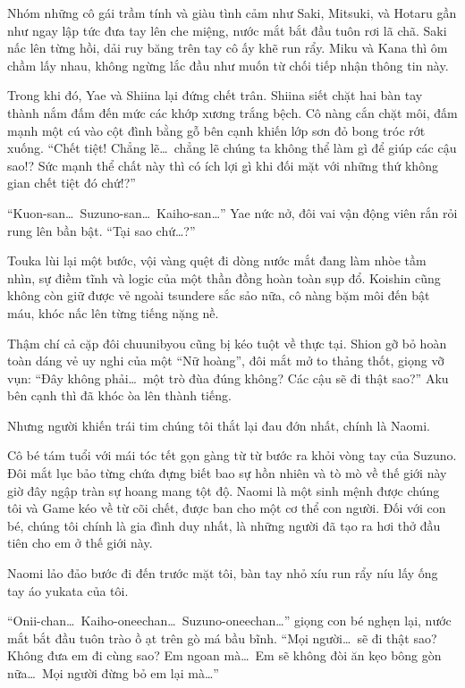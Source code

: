 \documentclass[../main.tex]{subfiles}
\begin{document}
Nhóm những cô gái trầm tính và giàu tình cảm như Saki, Mitsuki, và Hotaru gần như ngay lập tức đưa tay lên che miệng, nước mắt bắt đầu tuôn rơi lã chã. Saki nấc lên từng hồi, dải ruy băng trên tay cô ấy khẽ run rẩy. Miku và Kana thì ôm chầm lấy nhau, không ngừng lắc đầu như muốn từ chối tiếp nhận thông tin này.

Trong khi đó, Yae và Shiina lại đứng chết trân. Shiina siết chặt hai bàn tay thành nắm đấm đến mức các khớp xương trắng bệch. Cô nàng cắn chặt môi, đấm mạnh một cú vào cột đình bằng gỗ bên cạnh khiến lớp sơn đỏ bong tróc rớt xuống. ``Chết tiệt! Chẳng lẽ\dots\ chẳng lẽ chúng ta không thể làm gì để giúp các cậu sao!? Sức mạnh thể chất này thì có ích lợi gì khi đối mặt với những thứ không gian chết tiệt đó chứ!?''

``Kuon-san\dots\ Suzuno-san\dots\ Kaiho-san\dots'' Yae nức nở, đôi vai vận động viên rắn rỏi rung lên bần bật. ``Tại sao chứ\dots?''

Touka lùi lại một bước, vội vàng quệt đi dòng nước mắt đang làm nhòe tầm nhìn, sự điềm tĩnh và logic của một thần đồng hoàn toàn sụp đổ. Koishin cũng không còn giữ được vẻ ngoài tsundere sắc sảo nữa, cô nàng bặm môi đến bật máu, khóc nấc lên từng tiếng nặng nề.

Thậm chí cả cặp đôi chuunibyou cũng bị kéo tuột về thực tại. Shion gỡ bỏ hoàn toàn dáng vẻ uy nghi của một ``Nữ hoàng'', đôi mắt mở to thảng thốt, giọng vỡ vụn: ``Đây không phải\dots\ một trò đùa đúng không? Các cậu sẽ đi thật sao?'' Aku bên cạnh thì đã khóc òa lên thành tiếng.

Nhưng người khiến trái tim chúng tôi thắt lại đau đớn nhất, chính là Naomi.

Cô bé tám tuổi với mái tóc tết gọn gàng từ từ bước ra khỏi vòng tay của Suzuno. Đôi mắt lục bảo từng chứa đựng biết bao sự hồn nhiên và tò mò về thế giới này giờ đây ngập tràn sự hoang mang tột độ. Naomi là một sinh mệnh được chúng tôi và Game kéo về từ cõi chết, được ban cho một cơ thể con người. Đối với con bé, chúng tôi chính là gia đình duy nhất, là những người đã tạo ra hơi thở đầu tiên cho em ở thế giới này.

Naomi lảo đảo bước đi đến trước mặt tôi, bàn tay nhỏ xíu run rẩy níu lấy ống tay áo yukata của tôi.

``Onii-chan\dots\ Kaiho-oneechan\dots\ Suzuno-oneechan\dots'' giọng con bé nghẹn lại, nước mắt bắt đầu tuôn trào ồ ạt trên gò má bầu bĩnh. ``Mọi người\dots\ sẽ đi thật sao? Không đưa em đi cùng sao? Em ngoan mà\dots\ Em sẽ không đòi ăn kẹo bông gòn nữa\dots\ Mọi người đừng bỏ em lại mà\dots''
\end{document}

